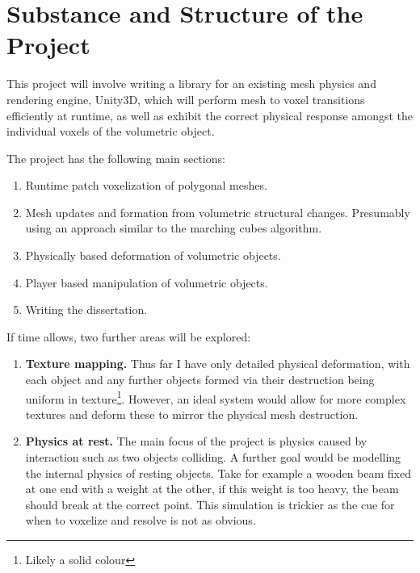 \section*{Substance and Structure of the Project}

This project will involve writing a library for an existing mesh physics and rendering engine, Unity3D, which will perform mesh to voxel transitions efficiently at runtime, as well as exhibit the correct physical response amongst the individual voxels of the volumetric object.

The project has the following main sections:

\begin{enumerate}

\item Runtime patch voxelization of polygonal meshes.

\item Mesh updates and formation from volumetric structural changes. Presumably using an approach similar to the marching cubes algorithm.

\item Physically based deformation of volumetric objects.

\item Player based manipulation of volumetric objects.

\item Writing the dissertation.

\end{enumerate}

If time allows, two further areas will be explored:

\begin{enumerate}

\item \textbf{Texture mapping.} Thus far I have only detailed physical deformation, with each object and any further objects formed via their destruction being uniform in texture\footnote{Likely a solid colour}. However, an ideal system would allow for more complex textures and deform these to mirror the physical mesh destruction.

\item \textbf{Physics at rest.} The main focus of the project is physics caused by interaction such as two objects colliding. A further goal would be modelling the internal physics of resting objects. Take for example a wooden beam fixed at one end with a weight at the other, if this weight is too heavy, the beam should break at the correct point. This simulation is trickier as the cue for when to voxelize and resolve is not as obvious.
\end{enumerate}


